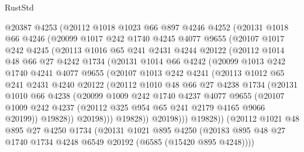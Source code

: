 \begin{lexlean}{RustStd}
\begin{coremodule}
      @20387
      @4253
      (@20112
        @1018
        @1023
        @66
        @897
        @4246
        @4252
        (@20131
          @1018
          @66
          @4246
          (@20099
            @1017
            @242
            @1740
            @4245
            @4077
            @9655
            (@20107
              @1017
              @242
              @4245
              (@20113
                @1016
                @65
                @241
                @2431
                @4244
                @20122
                (@20112
                  @1014
                  @48
                  @66
                  @27
                  @4242
                  @1734
                  (@20131
                    @1014
                    @66
                    @4242
                    (@20099
                      @1013
                      @242
                      @1740
                      @4241
                      @4077
                      @9655
                      (@20107
                        @1013
                        @242
                        @4241
                        (@20113
                          @1012
                          @65
                          @241
                          @2431
                          @4240
                          @20122
                          (@20112
                            @1010
                            @48
                            @66
                            @27
                            @4238
                            @1734
                            (@20131
                              @1010
                              @66
                              @4238
                              (@20099
                                @1009
                                @242
                                @1740
                                @4237
                                @4077
                                @9655
                                (@20107
                                  @1009
                                  @242
                                  @4237
                                  (@20112 @325 @954 @65 @241 @2179 @4165 @9066 @20199))
                                @19828))
                            @20198)))
                      @19828))
                  @20198)))
            @19828))
        (@20112
          @1021
          @48
          @895
          @27
          @4250
          @1734
          (@20131
            @1021
            @895
            @4250
            (@20183 @895 @48 @27 @1740 @1734 @4248 @6549 @20192 (@6585 (@15420 @895 @4248))))

\end{coremodule}
\end{lexlean}
